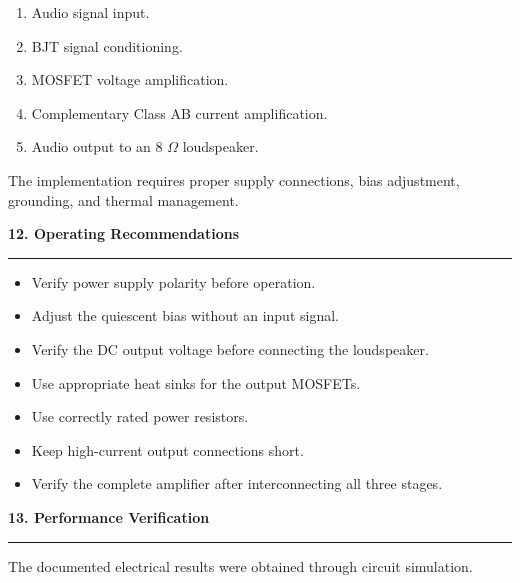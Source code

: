 \documentclass[10pt,letterpaper]{article}
\newcommand{\datasheetsection}[1]{
    \vspace{0.3cm}
    {\large\bfseries\color{datasheetblue}#1}
    \par\vspace{0.1cm}
    \hrule
    \vspace{0.15cm}
}
\begin{document}
\begin{enumerate}

\item Audio signal input.

\item BJT signal conditioning.

\item MOSFET voltage amplification.

\item Complementary Class AB current amplification.

\item Audio output to an 8 $\Omega$ loudspeaker.

\end{enumerate}

The implementation requires
proper supply connections,
bias adjustment, grounding,
and thermal management.

\datasheetsection{12. Operating Recommendations}

\begin{itemize}

\item Verify power supply polarity before operation.

\item Adjust the quiescent bias without an input signal.

\item Verify the DC output voltage before connecting
the loudspeaker.

\item Use appropriate heat sinks for the
output MOSFETs.

\item Use correctly rated power resistors.

\item Keep high-current output connections short.

\item Verify the complete amplifier after
interconnecting all three stages.

\end{itemize}

\datasheetsection{13. Performance Verification}

The documented electrical results
were obtained through circuit simulation.
\end{document}
